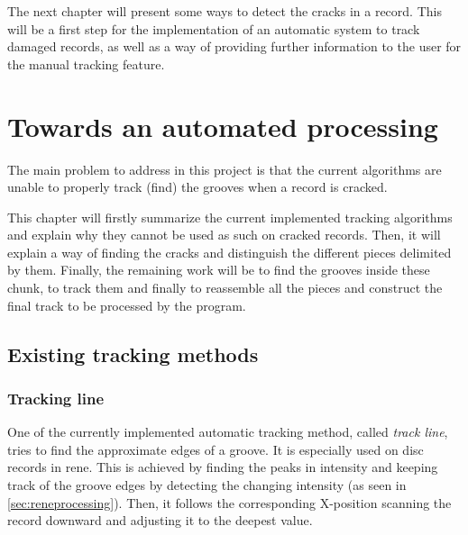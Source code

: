 The next chapter will present some ways to detect the cracks in a record. This will be a first step for the implementation of an automatic system to track damaged records, as well as a way of providing further information to the user for the manual tracking feature.


\chapter{Towards an automated processing}
\label{chap:groovedetect}

The main problem to address in this project is that the current algorithms are unable to properly track (find) the grooves when a record is cracked.

This chapter will firstly summarize the current implemented tracking algorithms and explain why they cannot be used as such on cracked records. Then, it will explain a way of finding the cracks and distinguish the different pieces delimited by them. %
Finally, the remaining work will be to find the grooves inside these chunk, to track them and finally to reassemble all the pieces and construct the final track to be processed by the program.

\section{Existing tracking methods}
\label{sec:trackmethods}

\subsection{Tracking line}

One of the currently implemented automatic tracking method, called \emph{track line}, tries to find the approximate edges of a groove. It is especially used on disc records in \gls{rene}. This is achieved by finding the peaks in intensity and keeping track of the groove edges by detecting the changing intensity (as seen in \autoref{sec:reneprocessing}). Then, it follows the corresponding X-position scanning the record downward and adjusting it to the deepest value.

